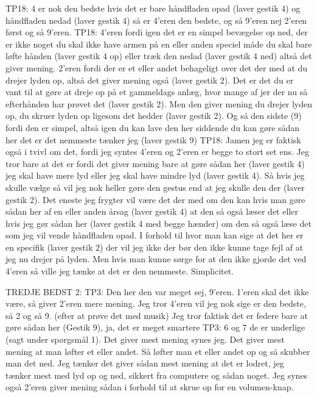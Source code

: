 TP18: 4 er nok den bedste hvis det er bare håndfladen opad (laver gestik 4) og håndfladen nedad (laver gestik 4) så er 4’eren den bedste, og så 9’eren nej 2’eren først og så 9’eren. 
TP18: 4’eren fordi igen det er en simpel bevægelse op ned, der er ikke noget du skal ikke have armen på en eller anden speciel måde du skal bare løfte hånden (laver gestik 4 op) eller træk den nedad (laver gestik 4 ned) altså det giver mening. 2’eren fordi der er et eller andet behageligt over det der med at du drejer lyden op, altså det giver mening også (laver gestik 2).  Det er det du er vant til at gøre at dreje op på et gammeldags anlæg, hvor mange af jer der nu så efterhånden har prøvet det (laver gestik 2). Men den giver mening du drejer lyden op, du skruer lyden op ligesom det hedder (laver gestik 2). Og så den sidste (9) fordi den er simpel, altså igen du kan lave den her siddende du kan gøre sådan her det er det nemmeste tænker jeg (laver gestik 9)
TP18:  Jamen jeg er faktisk også i tvivl om det, fordi jeg syntes 4’eren og 2’eren er begge to stort set ens. Jeg tror bare at det er fordi det giver mening bare at gøre sådan her (laver gestik 4) jeg skal have mere lyd eller jeg skal have mindre lyd (laver gestik 4). Så hvis jeg skulle vælge så vil jeg nok heller gøre den gestus end at jeg skulle den der (laver gestik 2). Det eneste jeg frygter vil være det der med om den kan hvis man gøre sådan her af en eller anden årsag (laver gestik 4) at den så også læser det eller hvis jeg gør sådan her (laver gestik 4 med begge hænder) om den så også læse det som jeg vil vende håndfladen opad. I forhold til hvor man kan sige at det her er en specifik (laver gestik 2) der vil jeg ikke der bør den ikke kunne tage fejl af at jeg nu drejer på lyden. Men hvis man kunne sørge for at den ikke gjorde det ved 4’eren så ville jeg tænke at det er den nemmeste. Simplicitet. 

TREDJE BEDST 2: 
TP3: Den her den var meget sej, 9’eren. 1’eren skal det ikke være, så giver 2’eren mere mening. Jeg tror 4’eren vil jeg nok sige er den bedste, så 2 og så 9. (efter at prøve det med musik) Jeg tror faktisk det er federe bare at gøre sådan her (Gestik 9), ja, det er meget smartere
TP3: 6 og 7 de er underlige (sagt under spørgsmål 1). Det giver mest mening synes jeg. Det giver mest mening at man løfter et eller andet. Så løfter man et eller andet op og så skubber man det ned. Jeg tænker det giver sådan mest mening at det er lodret, jeg tænker mest med lyd op og ned, sikkert fra computere og sådan noget. Jeg synes også 2’eren giver mening sådan i forhold til at skrue op for en volumen-knap.

